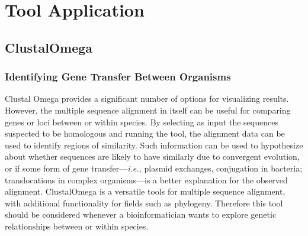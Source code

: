 \section{Tool Application}

    \subsection{ClustalOmega}
        \subsubsection{Identifying Gene Transfer Between Organisms}
        Clustal Omega provides a significant number of options for visualizing results. However, the multiple sequence alignment in itself can be useful for comparing genes or loci between or within species. By selecting as input the sequences suspected to be homologous and running the tool, the alignment data can be used to identify regions of similarity.\autocite{L4} Such information can be used to hypothesize about whether sequences are likely to have similarly due to convergent evolution, or if some form of gene transfer---\emph{i.e.,} plasmid exchanges, conjugation in bacteria; translocations in complex organisms---is a better explanation for the observed alignment.\autocite{L4} ClustalOmega is a versatile tools for multiple sequence alignment, with additional functionality for fields such as phylogeny. Therefore this tool should be considered whenever a bioinformatician wants to explore genetic relationships between or within species.